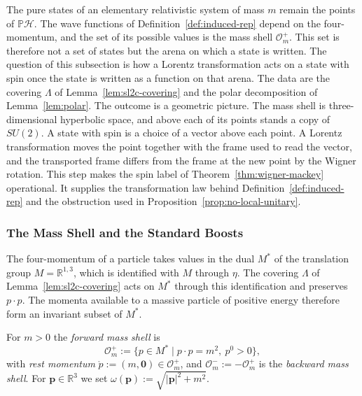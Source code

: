The pure states of an elementary relativistic system of mass $m$ remain the points of $\mathbb{P}\mathcal{H}$. The wave functions of Definition~\ref{def:induced-rep} depend on the four-momentum, and the set of its possible values is the mass shell $\mathcal{O}_m^+$. This set is therefore not a set of states but the arena on which a state is written. The question of this subsection is how a Lorentz transformation acts on a state with spin once the state is written as a function on that arena. The data are the covering $\Lambda$ of Lemma~\ref{lem:sl2c-covering} and the polar decomposition of Lemma~\ref{lem:polar}. The outcome is a geometric picture. The mass shell is three-dimensional hyperbolic space, and above each of its points stands a copy of $SU(2)$. A state with spin is a choice of a vector above each point. A Lorentz transformation moves the point together with the frame used to read the vector, and the transported frame differs from the frame at the new point by the Wigner rotation. This step makes the spin label of Theorem~\ref{thm:wigner-mackey} operational. It supplies the transformation law behind Definition~\ref{def:induced-rep} and the obstruction used in Proposition~\ref{prop:no-local-unitary}.

\subsubsection*{The Mass Shell and the Standard Boosts}

The four-momentum of a particle takes values in the dual $M^*$ of the translation group $M=\mathbb{R}^{1,3}$, which is identified with $M$ through $\eta$. The covering $\Lambda$ of Lemma~\ref{lem:sl2c-covering} acts on $M^*$ through this identification and preserves $p\cdot p$. The momenta available to a massive particle of positive energy therefore form an invariant subset of $M^*$.

\begin{definition}\label{def:mass-shell}
	For $m>0$ the \emph{forward mass shell} is
	\begin{equation*}
		\mathcal{O}_m^+:=\{p\in M^*\mid p\cdot p=m^2,\ p^0>0\},
	\end{equation*}
	with \emph{rest momentum} $\mathring{p}:=(m,\mathbf{0})\in\mathcal{O}_m^+$, and $\mathcal{O}_m^-:=-\mathcal{O}_m^+$ is the \emph{backward mass shell}. For $\mathbf{p}\in\mathbb{R}^3$ we set $\omega(\mathbf{p}):=\sqrt{|\mathbf{p}|^2+m^2}$.
\end{definition}

